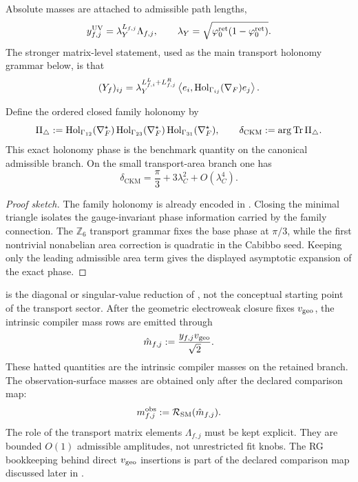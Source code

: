 Absolute masses are attached to admissible path lengths,
\begin{equation}
\label{eq:path-length-yukawa}
y_{f,j}^{\mathrm{UV}}=\lambda_Y^{L_{f,j}}\Lambda_{f,j},
\qquad
\lambda_Y=\sqrt{\varphi_0^{\mathrm{ret}}(1-\varphi_0^{\mathrm{ret}})}.
\end{equation}
The stronger matrix-level statement, used as the main transport holonomy grammar below, is that
\begin{equation}
\label{eq:yukawa-holonomy-matrix}
(Y_f)_{ij}
=
\lambda_Y^{L^L_{f,i}+L^R_{f,j}}
\left\langle e_i,\mathrm{Hol}_{\Gamma_{ij}}(\nabla_F)e_j\right\rangle.
\end{equation}
\begin{proposition}
\label{prop:holonomy-triangle-phase}
\label{prop:exact-family-holonomy-phase}
Define the ordered closed family holonomy by
\[
\Pi_\triangle
:=
\mathrm{Hol}_{\Gamma_{12}}(\nabla_F^\star)\,
\mathrm{Hol}_{\Gamma_{23}}(\nabla_F^\star)\,
\mathrm{Hol}_{\Gamma_{31}}(\nabla_F^\star),
\qquad
\delta_{\mathrm{CKM}}
:=
\arg\operatorname{Tr}\Pi_\triangle.
\]
This exact holonomy phase is the benchmark quantity on the canonical admissible branch. On the
small transport-area branch one has
\begin{equation}
\label{eq:ckm-holonomy-phase}
\delta_{\mathrm{CKM}}
=
\frac{\pi}{3}+3\lambda_C^2+O(\lambda_C^4).
\end{equation}
\end{proposition}

\begin{proof}[Proof sketch]
The family holonomy is already encoded in . Closing the
minimal triangle isolates the gauge-invariant phase information carried by the family
connection. The $\mathbb Z_6$ transport grammar fixes the base phase at $\pi/3$, while the
first nontrivial nonabelian area correction is quadratic in the Cabibbo seed. Keeping only the
leading admissible area term gives the displayed asymptotic expansion of the exact phase.
\end{proof}

 is the diagonal or singular-value reduction of , not the conceptual starting point of the transport sector.
After the geometric electroweak closure fixes $v_{\mathrm{geo}}$, the intrinsic compiler mass rows are emitted through
\begin{equation}
\label{eq:mass-bridge}
\hat m_{f,j}:=\frac{y_{f,j}v_{\mathrm{geo}}}{\sqrt2}.
\end{equation}
These hatted quantities are the intrinsic compiler masses on the retained branch. The observation-surface masses are obtained only after the declared comparison map:
\[
m_{f,j}^{\mathrm{obs}}:=\mathcal R_{\mathrm{SM}}(\hat m_{f,j}).
\]
The role of the transport matrix elements $\Lambda_{f,j}$ must be kept explicit. They are bounded $O(1)$ admissible amplitudes, not unrestricted fit knobs. The RG bookkeeping behind direct $v_{\mathrm{geo}}$ insertions is part of the declared comparison map discussed later in .

